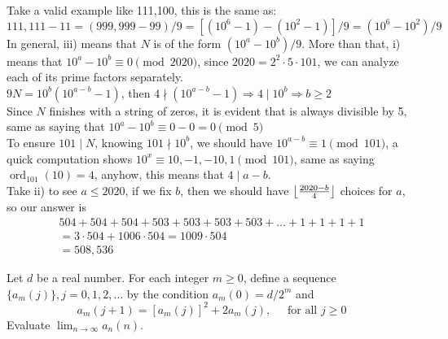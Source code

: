 \begin{solution}[508,536]
    Take a valid example like 111,100, this is the same as:\\
    $111,111-11=(999,999-99)/9=\left[(10^6-1)-(10^2-1)\right]/9=(10^6-10^2)/9$\\
    In general, iii) means that $N$ is of the form $(10^a-10^b)/9$. More than that, i) means that $10^a-10^b \equiv 0 \pmod{2020}$, since $2020=2^2 \cdot 5 \cdot 101$, we can analyze each of its prime factors separately.\\
    $9N=10^b(10^{a-b}-1)$, then $4 \nmid (10^{a-b}-1) \Rightarrow 4\mid 10^b \Rightarrow b\geq 2$\\ 
    Since $N$ finishes with a string of zeros, it is evident that is always divisible by 5, same as saying that $10^a-10^b\equiv0-0=0 \pmod 5$\\
    To ensure $101 \mid N$, knowing $101 \nmid 10^b$, we should have $10^{a-b} \equiv 1 \pmod{101}$, a quick computation shows $10^x \equiv 10,-1,-10,1 \pmod{101}$, same as saying $\operatorname{ord}_{101}(10) = 4$, anyhow, this means that $4 \mid a-b$.\\
    Take ii) to see $a\leq 2020$, if we fix $b$, then we should have $\myFloor[4]{2020-b}$ choices for $a$, so our answer is
    \begin{align*}
    504+504+504+503+503+503+503+\ldots+1+1+1+1\\
    =3\cdot504 +1006\cdot504=1009\cdot504\\
    =\boxed{508,536}
    \end{align*}
\end{solution}

\begin{problem}[A][6][Putnam 1985]
     Let $d$ be a real number. For each integer $m \geq 0$, define a sequence $\{a_m(j)\},j=0,1,2,\ldots$ by the condition $a_m(0)=d/2^m$ and
    $$ a_m(j+1) = [a_m(j)]^2 + 2a_m(j) \text{,}\hspace{15pt} \text{ for all }  j\geq0 $$
    Evaluate $ \lim_ {n \rightarrow \infty} a_n(n)$.%
\end{problem}

